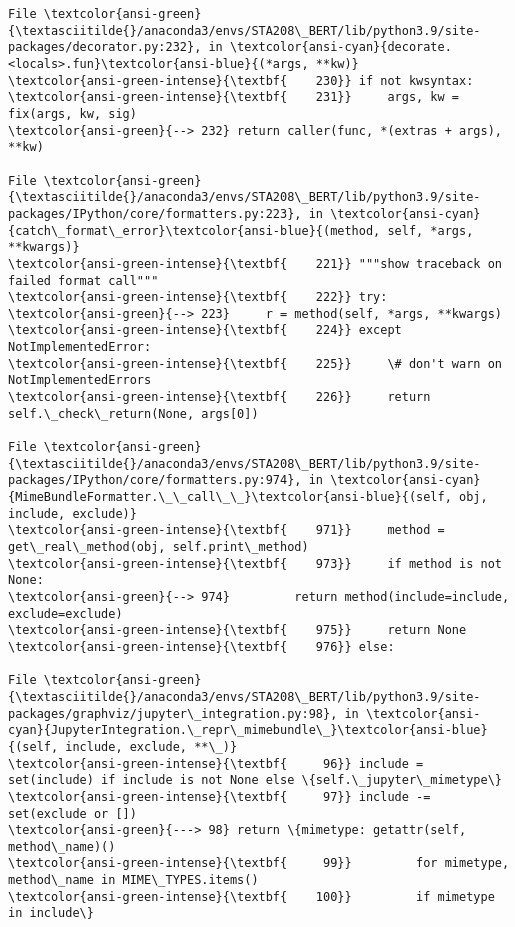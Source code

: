\documentclass[11pt]{article}
\begin{document}
\begin{Verbatim}[commandchars=\\\{\}, frame=single, framerule=2mm, rulecolor=\color{outerrorbackground}]
File \textcolor{ansi-green}{\textasciitilde{}/anaconda3/envs/STA208\_BERT/lib/python3.9/site-packages/decorator.py:232}, in \textcolor{ansi-cyan}{decorate.<locals>.fun}\textcolor{ansi-blue}{(*args, **kw)}
\textcolor{ansi-green-intense}{\textbf{    230}} if not kwsyntax:
\textcolor{ansi-green-intense}{\textbf{    231}}     args, kw = fix(args, kw, sig)
\textcolor{ansi-green}{--> 232} return caller(func, *(extras + args), **kw)

File \textcolor{ansi-green}{\textasciitilde{}/anaconda3/envs/STA208\_BERT/lib/python3.9/site-packages/IPython/core/formatters.py:223}, in \textcolor{ansi-cyan}{catch\_format\_error}\textcolor{ansi-blue}{(method, self, *args, **kwargs)}
\textcolor{ansi-green-intense}{\textbf{    221}} """show traceback on failed format call"""
\textcolor{ansi-green-intense}{\textbf{    222}} try:
\textcolor{ansi-green}{--> 223}     r = method(self, *args, **kwargs)
\textcolor{ansi-green-intense}{\textbf{    224}} except NotImplementedError:
\textcolor{ansi-green-intense}{\textbf{    225}}     \# don't warn on NotImplementedErrors
\textcolor{ansi-green-intense}{\textbf{    226}}     return self.\_check\_return(None, args[0])

File \textcolor{ansi-green}{\textasciitilde{}/anaconda3/envs/STA208\_BERT/lib/python3.9/site-packages/IPython/core/formatters.py:974}, in \textcolor{ansi-cyan}{MimeBundleFormatter.\_\_call\_\_}\textcolor{ansi-blue}{(self, obj, include, exclude)}
\textcolor{ansi-green-intense}{\textbf{    971}}     method = get\_real\_method(obj, self.print\_method)
\textcolor{ansi-green-intense}{\textbf{    973}}     if method is not None:
\textcolor{ansi-green}{--> 974}         return method(include=include, exclude=exclude)
\textcolor{ansi-green-intense}{\textbf{    975}}     return None
\textcolor{ansi-green-intense}{\textbf{    976}} else:

File \textcolor{ansi-green}{\textasciitilde{}/anaconda3/envs/STA208\_BERT/lib/python3.9/site-packages/graphviz/jupyter\_integration.py:98}, in \textcolor{ansi-cyan}{JupyterIntegration.\_repr\_mimebundle\_}\textcolor{ansi-blue}{(self, include, exclude, **\_)}
\textcolor{ansi-green-intense}{\textbf{     96}} include = set(include) if include is not None else \{self.\_jupyter\_mimetype\}
\textcolor{ansi-green-intense}{\textbf{     97}} include -= set(exclude or [])
\textcolor{ansi-green}{---> 98} return \{mimetype: getattr(self, method\_name)()
\textcolor{ansi-green-intense}{\textbf{     99}}         for mimetype, method\_name in MIME\_TYPES.items()
\textcolor{ansi-green-intense}{\textbf{    100}}         if mimetype in include\}


\end{Verbatim}
\end{document}
